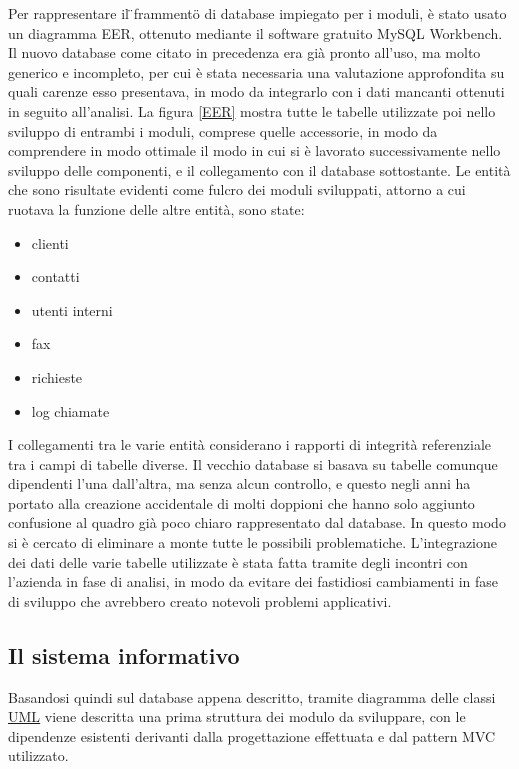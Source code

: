 \noindent
Per rappresentare il \"{}frammento\"{} di database impiegato per i moduli, \`e stato usato un diagramma EER, ottenuto mediante il software gratuito MySQL Workbench. Il nuovo database come citato in precedenza era gi\`a pronto all'uso, ma molto generico e incompleto, per cui \`e stata necessaria una valutazione approfondita su quali carenze esso presentava, in modo da integrarlo con i dati mancanti ottenuti in seguito all'analisi. La figura \ref{EER} mostra tutte le tabelle utilizzate poi nello sviluppo di entrambi i moduli, comprese quelle accessorie, in modo da comprendere in modo ottimale il modo in cui si \`e lavorato successivamente nello sviluppo delle componenti, e il collegamento con il database sottostante. Le entit\`a che sono risultate evidenti come fulcro dei moduli sviluppati, attorno a cui ruotava la funzione delle altre entit\`a, sono state:
\begin{itemize}
  \item clienti
  \item contatti
  \item utenti interni
  \item fax
  \item richieste
  \item log chiamate
\end{itemize}

I collegamenti tra le varie entit\`a considerano i rapporti di integrit\`a referenziale tra i campi di tabelle diverse. Il vecchio database si basava su tabelle comunque dipendenti l'una dall'altra, ma senza alcun controllo, e questo negli anni ha portato alla creazione accidentale di molti doppioni che hanno solo aggiunto confusione al quadro gi\`a poco chiaro rappresentato dal database. In questo modo si \`e cercato di eliminare a monte tutte le possibili problematiche.
L'integrazione dei dati delle varie tabelle utilizzate \`e stata fatta tramite degli incontri con l'azienda in fase di analisi, in modo da evitare dei fastidiosi cambiamenti in fase di sviluppo che avrebbero creato notevoli problemi applicativi.

\newpage
\subsection{Il sistema informativo}
Basandosi quindi sul database appena descritto, tramite diagramma delle classi \hyperlink{uml}{\underline{UML}} viene descritta una prima struttura dei modulo da sviluppare, con le dipendenze esistenti derivanti dalla progettazione effettuata e dal pattern MVC utilizzato.

